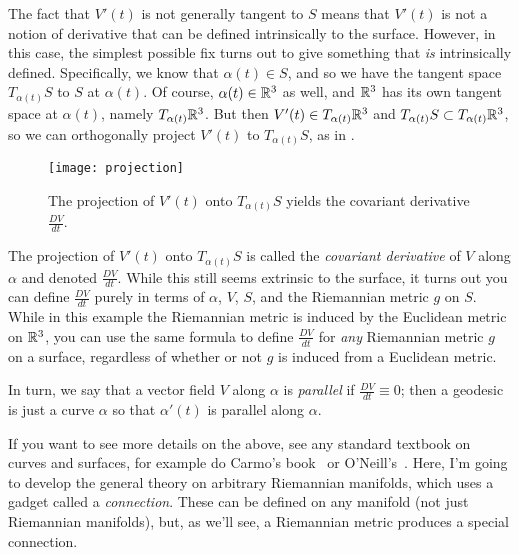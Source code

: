 The fact that $V'(t)$ is not generally tangent to $S$ means that $V'(t)$ is not a notion of derivative that can be defined intrinsically to the surface. However, in this case, the simplest possible fix turns out to give something that \emph{is} intrinsically defined. Specifically, we know that $\alpha(t) \in S$, and so we have the tangent space $T_{\alpha(t)}S$ to $S$ at $\alpha(t)$. Of course, $\alpha(t) \in \mathbb{R}^3$ as well, and $\mathbb{R}^3$ has its own tangent space at $\alpha(t)$, namely $T_{\alpha(t)}\mathbb{R}^3$. But then $V'(t) \in T_{\alpha(t)}\mathbb{R}^3$ and $T_{\alpha(t)} S \subset T_{\alpha(t)}\mathbb{R}^3$, so we can orthogonally project $V'(t)$ to $T_{\alpha(t)}S$, as in .

\begin{figure}[htbp]
	\centering
		\texttt{[image: projection]}
	\caption{The projection of $V'(t)$ onto $T_{\alpha(t)}S$ yields the covariant derivative $\frac{DV}{dt}$.}
	\label{fig:projection}
\end{figure}

The projection of $V'(t)$ onto $T_{\alpha(t)}S$ is called the \emph{covariant derivative} of $V$ along $\alpha$ and denoted $\frac{DV}{dt}$. While this still seems extrinsic to the surface, it turns out you can define $\frac{DV}{dt}$ purely in terms of $\alpha$, $V$, $S$, and the Riemannian metric $g$ on $S$. While in this example the Riemannian metric is induced by the Euclidean metric on $\mathbb{R}^3$, you can use the same formula to define $\frac{DV}{dt}$ for \emph{any} Riemannian metric $g$ on a surface, regardless of whether or not $g$ is induced from a Euclidean metric.

In turn, we say that a vector field $V$ along $\alpha$ is \emph{parallel} if $\frac{DV}{dt} \equiv 0$; then a geodesic is just a curve $\alpha$ so that $\alpha'(t)$ is parallel along $\alpha$. 

If you want to see more details on the above, see any standard textbook on curves and surfaces, for example do Carmo's book~\cite{carmoDifferentialGeometryCurves1976} or O'Neill's~\cite{oneillElementaryDifferentialGeometry2006}. Here, I'm going to develop the general theory on arbitrary Riemannian manifolds, which uses a gadget called a \emph{connection}. These can be defined on any manifold (not just Riemannian manifolds), but, as we'll see, a Riemannian metric produces a special connection.


